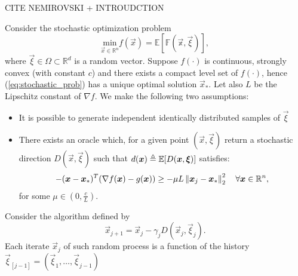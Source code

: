 
CITE NEMIROVSKI\cite{Nemirovski} + INTROUDCTION 

Consider the stochastic optimization problem 
\begin{equation}
\underset{\vec{x} \in \mathbb{R}^n}{\text{min}} f(\vec{x}) = \mathbb{E[F(\vec{x}, \vec{\xi})]},
\label{eq:stochastic_prob}
\end{equation}
where $\vec{\xi} \in \Omega \subset \mathbb{R}^d$ is a random vector.
Suppose $f(\cdot)$ is continuous, strongly convex (with constant $c$) and there exists a compact level set of $f(\cdot)$, hence (\ref{eq:stochastic_prob}) has a unique optimal solution $\vec{x}_*$. Let also $L$ be the Lipschitz constant of $\nabla f$.
We make the following two assumptions:
\begin{itemize}
	\item	It is possible to generate independent identically distributed samples of $\vec{\xi}$
	\item There exists an oracle which, for a given point $(\vec{x}, \vec{\xi})$ return a stochastic direction $D(\vec{x}, \vec{\xi})$ such that $d(\boldsymbol{x})\triangleq\mathbb{E}[D(\boldsymbol{x}, \boldsymbol{\xi})]$ satisfies:
	\begin{equation}
	-(\boldsymbol{x}-\boldsymbol{x}_*)^T (\nabla f(\boldsymbol{x}) -g(\boldsymbol{x})) \geq -\mu L \left\Vert \boldsymbol{x}_j-\boldsymbol{x}_* \right\Vert^2_2\quad \forall \boldsymbol{x} \in \mathbb{R}^n,
	\label{eq:angular_condition}
	\end{equation}
	for some $\mu \in (0,\frac{c}{L}) $.
\end{itemize}
Consider the algorithm defined by
\begin{equation}
\vec{x}_{j+1} = \vec{x}_j -\gamma_j D(\vec{x}_j,\vec{\xi}_j).
\label{eq:stochastic_algo}
\end{equation}
Each iterate $\vec{x}_j$ of such random process is a function of the history $\vec{\xi}_{[j-1]}=(\vec{\xi}_1,\dots, \vec{\xi}_{j-1})$

